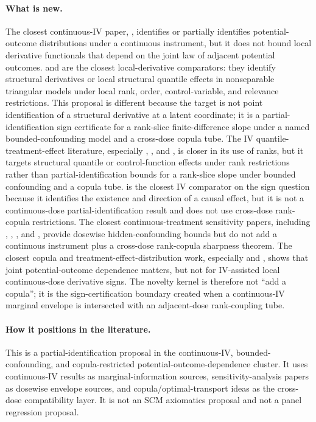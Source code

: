 \documentclass[11pt]{article}
\theoremstyle{definition}
\theoremstyle{plain}
\theoremstyle{remark}
\begin{document}
\paragraph{What is new.}
The closest continuous-IV paper, \citet{Kasy2014}, identifies or partially identifies potential-outcome distributions under a continuous instrument, but it does not bound local derivative functionals that depend on the joint law of adjacent potential outcomes.  \citet{Chesher2003} and \citet{Jun2009} are the closest local-derivative comparators: they identify structural derivatives or local structural quantile effects in nonseparable triangular models under local rank, order, control-variable, and relevance restrictions.  This proposal is different because the target is not point identification of a structural derivative at a latent coordinate; it is a partial-identification sign certificate for a rank-slice finite-difference slope under a named bounded-confounding model and a cross-dose copula tube.  The IV quantile-treatment-effect literature, especially \citet{ChernozhukovHansen2005}, \citet{ChernozhukovHansen2006}, and \citet{ImbensNewey2009}, is closer in its use of ranks, but it targets structural quantile or control-function effects under rank restrictions rather than partial-identification bounds for a rank-slice slope under bounded confounding and a copula tube.  \citet{Kline2016} is the closest IV comparator on the sign question because it identifies the existence and direction of a causal effect, but it is not a continuous-dose partial-identification result and does not use cross-dose rank-copula restrictions.  The closest continuous-treatment sensitivity papers, including \citet{JessonDouglasManshausenSolalMeinshausenStierGalShalit2022}, \citet{MarmarelisHaddadJessonJahanshadGalstyanVerSteeg2023}, \citet{BaitairianSebastienJreichKatsahianGuilloux2025}, and \citet{DalalTchetgenTchetgen2025}, provide dosewise hidden-confounding bounds but do not add a continuous instrument plus a cross-dose rank-copula sharpness theorem.  The closest copula and treatment-effect-distribution work, especially \citet{FirpoRidder2019} and \citet{MadigasekaraPoskittZhangZhao2024}, shows that joint potential-outcome dependence matters, but not for IV-assisted local continuous-dose derivative signs.  The novelty kernel is therefore not ``add a copula''; it is the sign-certification boundary created when a continuous-IV marginal envelope is intersected with an adjacent-dose rank-coupling tube.

\paragraph{How it positions in the literature.}
This is a partial-identification proposal in the continuous-IV, bounded-confounding, and copula-restricted potential-outcome-dependence cluster.  It uses continuous-IV results as marginal-information sources, sensitivity-analysis papers as dosewise envelope sources, and copula/optimal-transport ideas as the cross-dose compatibility layer.  It is not an SCM axiomatics proposal and not a panel regression proposal.
\end{document}
